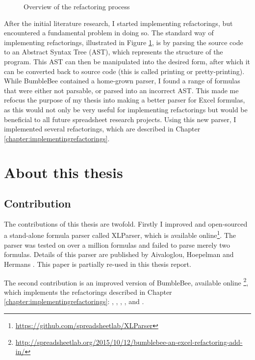 \begin{figure}
\centerfloat

\caption{Overview of the refactoring process}
\label{fig:refactoring-process}
\end{figure}

After the initial literature research, I started implementing refactorings, but encountered a fundamental problem in doing so.
The standard way of implementing refactorings, illustrated in Figure \ref{fig:refactoring-process}, is by parsing the source code to an Abstract Syntax Tree (AST), which represents the structure of the program.
This AST can then be manipulated into the desired form, after which it can be converted back to source code (this is called printing or pretty-printing).
While BumbleBee contained a home-grown parser, I found a range of formulas that were either not parsable, or parsed into an incorrect AST.
This made me refocus the purpose of my thesis into making a better parser for Excel formulas, as this would not only be very useful for implementing refactorings but would be beneficial to all future spreadsheet research projects.
Using this new parser, I implemented several refactorings, which are described in Chapter \ref{chapter:implementingrefactorings}.

\section{About this thesis}

\subsection{Contribution}

The contributions of this thesis are twofold.
Firstly I improved and open-sourced a stand-alone formula parser called XLParser, which is available online\footnote{\url{https://github.com/spreadsheetlab/XLParser}}.
The parser was tested on over a million formulas and failed to parse merely two formulas.
Details of this parser are published by Aivaloglou, Hoepelman and Hermans \cite{xlparser}.
This paper is partially re-used in this thesis report.

The second contribution is an improved version of BumbleBee, available online \footnote{\url{http://spreadsheetlab.org/2015/10/12/bumblebee-an-excel-refactoring-add-in/}}, which implements the refactorings described in Chapter \ref{chapter:implementingrefactorings}: , , , ,  and .


